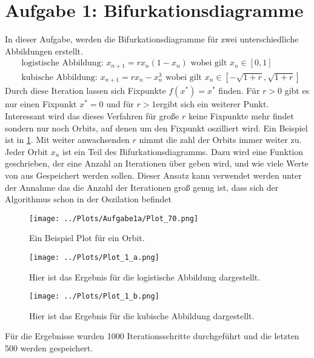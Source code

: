 
\section*{Aufgabe 1: Bifurkationsdiagramme}
	In dieser Aufgabe, werden die Bifurkationsdiagramme für zwei unterschiedliche Abbildungen erstellt.
	\begin{align}
		&\text{logistische Abbildung: }x_{n+1}=rx_n(1-x_n)\text{ wobei gilt }x_n\in[0,1]\label{eq:logistik}\\
		&\text{kubische Abbildung: }x_{n+1}=rx_n-x^3_n\text{ wobei gilt }x_n\in[-\sqrt{1+r},\sqrt{1+r}]
	\end{align}
	Durch diese Iteration lassen sich Fixpunkte $f(x^*)=x^*$ finden.
	Für $r>0$ gibt es nur einen Fixpunkt $x^*=0$
	und für $r>1$ergibt sich ein weiterer Punkt. 
	Interessant wird das dieses Verfahren für große $r$ keine Fixpunkte mehr findet sondern nur noch Orbits, auf denen um den Fixpunkt oszilliert wird.
	Ein Beispiel ist in \cref{fig:Orbit}.
	Mit weiter anwachsenden $r$ nimmt die zahl der Orbits immer weiter zu.
	Jeder Orbit $x_n$ ist ein Teil des Bifurkationsdiagramms.
	Dazu wird eine Funktion geschrieben, der eine Anzahl an Iterationen über geben wird, und wie viele Werte von aus Gespeichert werden sollen.
	Dieser Ansatz kann verwendet werden unter der Annahme das die Anzahl der Iterationen groß genug ist, dass sich der Algorithmus schon in der Oszilation befindet
	\begin{figure}
		\centering
		\texttt{[image: ../Plots/Aufgabe1a/Plot\_70.png]}\caption{Ein Beispiel Plot für ein Orbit.}\label{fig:Orbit}
	\end{figure}
	\begin{figure}
		\centering
		\texttt{[image: ../Plots/Plot\_1\_a.png]}
		\caption{Hier ist das Ergebnis für die logistische Abbildung dargestellt.}
	\end{figure}
	\begin{figure}
		\centering
		\texttt{[image: ../Plots/Plot\_1\_b.png]}
		\caption{Hier ist das Ergebnis für die kubische Abbildung dargestellt.}
	\end{figure}
	Für die Ergebnisse wurden 1000 Iterationsschritte durchgeführt und die letzten 500 werden gespeichert.